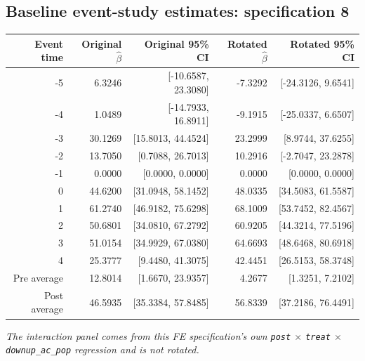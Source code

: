\documentclass[10pt]{article}
\begin{document}
\subsection*{Baseline event-study estimates: specification 8}
\begin{center}
\scriptsize
\begin{tabular}{r rr rr}
\toprule
Event time & Original $\hat\beta$ & Original 95\% CI & Rotated $\hat\beta$ & Rotated 95\% CI \\
\midrule
-5 & 6.3246 & [-10.6587, 23.3080] & -7.3292 & [-24.3126, 9.6541] \\
-4 & 1.0489 & [-14.7933, 16.8911] & -9.1915 & [-25.0337, 6.6507] \\
-3 & 30.1269 & [15.8013, 44.4524] & 23.2999 & [8.9744, 37.6255] \\
-2 & 13.7050 & [0.7088, 26.7013] & 10.2916 & [-2.7047, 23.2878] \\
-1 & 0.0000 & [0.0000, 0.0000] & 0.0000 & [0.0000, 0.0000] \\
0 & 44.6200 & [31.0948, 58.1452] & 48.0335 & [34.5083, 61.5587] \\
1 & 61.2740 & [46.9182, 75.6298] & 68.1009 & [53.7452, 82.4567] \\
2 & 50.6801 & [34.0810, 67.2792] & 60.9205 & [44.3214, 77.5196] \\
3 & 51.0154 & [34.9929, 67.0380] & 64.6693 & [48.6468, 80.6918] \\
4 & 25.3777 & [9.4480, 41.3075] & 42.4451 & [26.5153, 58.3748] \\
\midrule
Pre average & 12.8014 & [1.6670, 23.9357] & 4.2677 & [1.3251, 7.2102] \\
Post average & 46.5935 & [35.3384, 57.8485] & 56.8339 & [37.2186, 76.4491] \\
\bottomrule
\end{tabular}
\end{center}
\medskip
\textit{The interaction panel comes from this FE specification's own \texttt{post} $\times$ \texttt{treat} $\times$ \texttt{downup\_ac\_pop} regression and is not rotated.}
\clearpage
\end{document}
